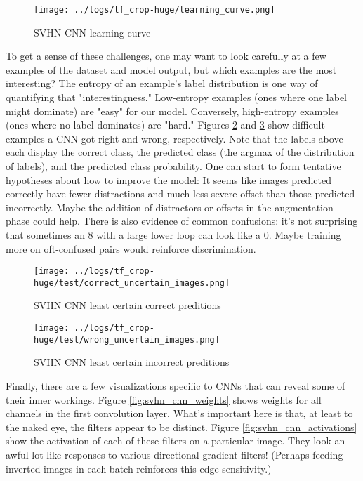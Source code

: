 \documentclass{article}
\begin{document}
\begin{figure}[htbp]
  \centering
  \texttt{[image: ../logs/tf\_crop-huge/learning\_curve.png]}
  \caption{SVHN CNN learning curve}
  \label{fig:svhn_cnn_lc}
\end{figure}

To get a sense of these challenges, one may want to look carefully at a few examples of the dataset and model output, but which examples are the most interesting? The entropy of an example's label distribution is one way of quantifying that "interestingness." Low-entropy examples (ones where one label might dominate) are "easy" for our model. Conversely, high-entropy examples (ones where no label dominates) are "hard." Figures \ref{fig:svhn_cnn_correct_uncertain_images} and \ref{fig:svhn_cnn_wrong_uncertain_images} show difficult examples a CNN got right and wrong, respectively.  Note that the labels above each display the correct class, the predicted class (the argmax of the distribution of labels), and the predicted class probability. One can start to form tentative hypotheses about how to improve the model: It seems like images predicted correctly have fewer distractions and much less severe offset than those predicted incorrectly. Maybe the addition of distractors or offsets in the augmentation phase could help. There is also evidence of common confusions: it's not surprising that sometimes an 8 with a large lower loop can look like a 0. Maybe training more on oft-confused pairs would reinforce discrimination.

\begin{figure}[htbp]
  \centering
  \texttt{[image: ../logs/tf\_crop-huge/test/correct\_uncertain\_images.png]}
  \caption{SVHN CNN least certain correct preditions}
  \label{fig:svhn_cnn_correct_uncertain_images}
\end{figure}

\begin{figure}[htbp]
  \centering
  \texttt{[image: ../logs/tf\_crop-huge/test/wrong\_uncertain\_images.png]}
  \caption{SVHN CNN least certain incorrect preditions}
  \label{fig:svhn_cnn_wrong_uncertain_images}
\end{figure}

Finally, there are a few visualizations specific to CNNs that can reveal some of their inner workings. Figure \ref{fig:svhn_cnn_weights} shows weights for all channels in the first convolution layer. What's important here is that, at least to the naked eye, the filters appear to be distinct. Figure \ref{fig:svhn_cnn_activations} show the activation of each of these filters on a particular image. They look an awful lot like responses to various directional gradient filters! (Perhaps feeding inverted images in each batch reinforces this edge-sensitivity.)
\end{document}
